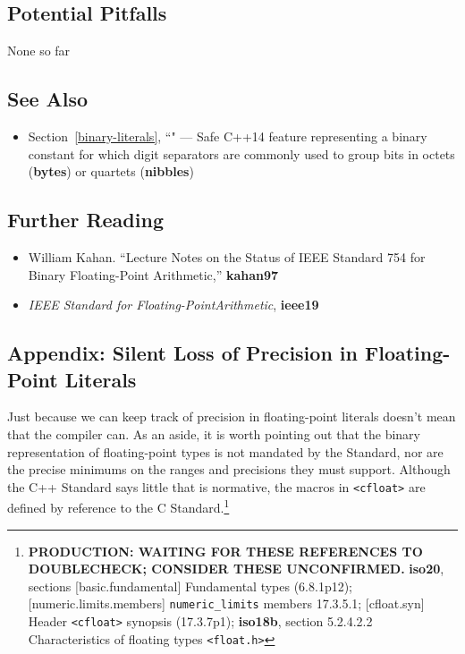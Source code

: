 \subsection[Potential Pitfalls]{Potential Pitfalls}\label{potential-pitfalls}

None so far

\subsection[See Also]{See Also}\label{see-also}

\begin{itemize}
\item{Section~\ref{binary-literals}, ``" — Safe C++14 feature representing a binary constant for which digit separators are commonly used to group bits in octets (\textbf{bytes}) or quartets (\textbf{nibbles})}
\end{itemize}

\subsection[Further Reading]{Further Reading}\label{further-reading}

\begin{itemize}
\item{William Kahan. ``Lecture Notes on the Status of
IEEE Standard 754 for Binary Floating-Point Arithmetic,'' \textbf{kahan97}}
\item{{\textit{IEEE Standard for Floating-PointArithmetic}}, \textbf{ieee19}}
\end{itemize} 

\subsection[Appendix: Silent Loss of Precision in Floating-Point Literals]{Appendix: Silent Loss of Precision in Floating-Point Literals}\label{appendix:-silent-loss-of-precision-in-floating-point-literals}

Just because we can keep track of precision in floating-point literals
doesn't mean that the compiler can. As an aside, it is worth
pointing out that the binary representation of floating-point types is
not mandated by the Standard, nor are the precise minimums on the ranges
and precisions they must support. Although the C++ Standard says little
that is normative, the macros in \texttt{<cfloat>} are defined by
reference to the C Standard.{\cprotect\footnote{\textbf{PRODUCTION: WAITING FOR THESE REFERENCES TO DOUBLECHECK; CONSIDER THESE UNCONFIRMED.} \textbf{iso20}, sections [basic.fundamental] Fundamental types (6.8.1p12); [numeric.limits.members] \texttt{numeric\_limits} members 17.3.5.1; [cfloat.syn] Header \texttt{<cfloat>} synopsis (17.3.7p1); \textbf{iso18b}, section 5.2.4.2.2 Characteristics of floating types \texttt{<float.h>} }}

